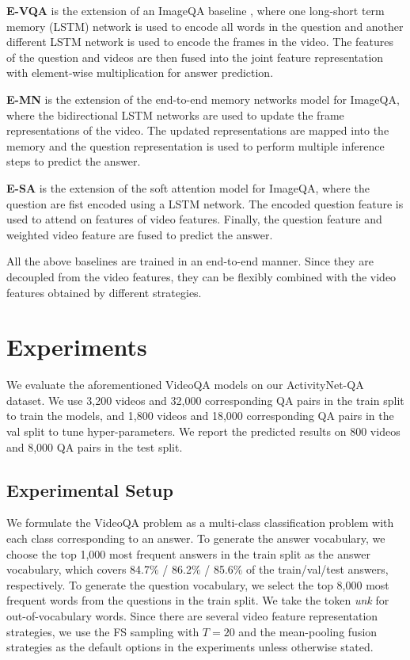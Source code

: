 \documentclass[letterpaper]{article} \usepackage{aaai19}  \usepackage{times}  \usepackage{helvet}  \usepackage{courier}  \usepackage{url}  \usepackage{graphicx}  \usepackage{amsfonts}
\begin{document}
\textbf{E-VQA} is the extension of an ImageQA baseline \cite{antol2015vqa}, where one long-short term memory (LSTM) network \cite{hochreiter1997long} is used to encode all words in the question and another different LSTM network is used to encode the frames in the video. The features of the question and videos are then fused into the joint feature representation with element-wise multiplication for answer prediction.

\textbf{E-MN} is the extension of the end-to-end memory networks model \cite{sukhbaatar2015end} for ImageQA, where the bidirectional LSTM networks are used to update the frame representations of the video. The updated representations are mapped into the memory and the question representation is used to perform multiple inference steps to predict the answer.

\textbf{E-SA} is the extension of the soft attention model \cite{yao2015describing} for ImageQA, where the question are fist encoded using a LSTM network. The encoded question feature is used to attend on features of video features. Finally, the question feature and weighted video feature are fused to predict the answer.

All the above baselines are trained in an end-to-end manner. Since they are decoupled from the video features, they can be flexibly combined with the video features obtained by different strategies.

\section{Experiments}
We evaluate the aforementioned VideoQA models on our ActivityNet-QA dataset. We use 3,200 videos and 32,000 corresponding QA pairs in the {train} split to train the models, and 1,800 videos and 18,000 corresponding QA pairs in the {val} split to tune hyper-parameters. We report the predicted results on 800 videos and 8,000 QA pairs in the {test} split.

\subsection{Experimental Setup}
We formulate the VideoQA problem as a multi-class classification problem with each class corresponding to an answer. To generate the answer vocabulary, we choose the top 1,000 most frequent answers in the train split as the answer vocabulary, which covers 84.7$\%$ / 86.2$\%$ / 85.6$\%$ of the train/val/test answers, respectively. To generate the question vocabulary, we select the top 8,000 most frequent words from the questions in the {train} split. We take the token \emph{unk} for out-of-vocabulary words. Since there are several video feature representation strategies, we use the FS sampling with $T=20$ and the mean-pooling fusion strategies as the default options in the experiments unless otherwise stated.
\end{document}
